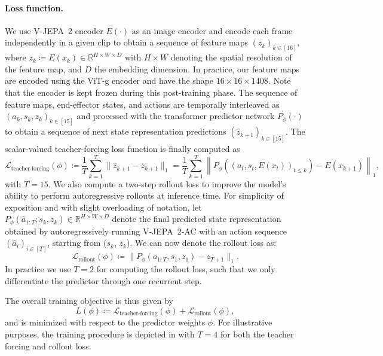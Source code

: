 \documentclass[]{fairmeta}
\newcommand{\model}{V-JEPA~2\xspace}
\newcommand{\acModel}{V-JEPA~2-AC\xspace}
\begin{document}
\paragraph{\bf Loss function.}
We use \model encoder $E(\cdot)$ as an image encoder and encode each frame independently in a given clip to obtain a sequence of feature maps $(z_k)_{k\in[16]}$, where $z_k \coloneqq E(x_k) \in \mathbb{R}^{H \times W \times D}$ with $H \times W$ denoting the spatial resolution of the feature map, and $D$ the embedding dimension.
In practice, our feature maps are encoded using the ViT-g encoder and have the shape $16 \times 16 \times 1408$.
Note that the encoder is kept frozen during this post-training phase.
The sequence of feature maps, end-effector states, and actions are temporally interleaved as $(a_k, s_k, z_k)_{k \in [15]}$ and processed with the transformer predictor network $P_\phi(\cdot)$ to obtain a sequence of next state representation predictions $(\hat{z}_{k+1})_{k \in [15]}$.
The scalar-valued teacher-forcing loss function is finally computed as
\begin{equation}
    \label{eq:loss-wm-tf}
    \mathcal{L}_{\text{teacher-forcing}}(\phi) \coloneqq \frac{1}{T} \sum^{T}_{k=1} \lVert \hat{z}_{k+1} - z_{k+1} \rVert_1 = \frac{1}{T} \sum^{T}_{k=1} \left\lVert P_\phi\left( \left(a_t, s_t, E(x_t)\right)_{t \leq k} \right) - E(x_{k+1}) \right\rVert_1,
\end{equation}
with $T=15$.
We also compute a two-step rollout loss to improve the model's ability to perform autoregressive rollouts at inference time.
For simplicity of exposition and with slight overloading of notation, let $P_\phi(\hat{a}_{1:T}; s_k, z_k) \in \mathbb{R}^{H \times W \times D}$ denote the final predicted state representation obtained by autoregressively running \acModel with an action sequence $(\hat{a}_i)_{i \in [T]}$, starting from ($s_k$, $z_k$).
We can now denote the rollout loss as:
\begin{equation}
    \label{eq:loss-wm-rollout}
    \mathcal{L}_{\text{rollout}}(\phi) \coloneqq \lVert P_\phi(a_{1:T}, s_1, z_1) - z_{T+1} \rVert_1.
\end{equation}
In practice we use $T=2$ for computing the rollout loss, such that we only differentiate the predictor through one recurrent step.

The overall training objective is thus given by
\begin{equation}
    L(\phi) \coloneqq \mathcal{L}_{\text{teacher-forcing}}(\phi) + \mathcal{L}_{\text{rollout}}(\phi),
\end{equation}
and is minimized with respect to the predictor weights $\phi$.
For illustrative purposes, the training procedure is depicted in  with $T=4$ for both the teacher forcing and rollout loss.
\end{document}
